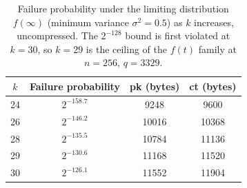 \begin{table}[h]
\centering
\caption{Failure probability under the limiting distribution $f(\infty)$
(minimum variance $\sigma^2=0.5$) as $k$ increases, uncompressed. The
$2^{-128}$ bound is first violated at $k=30$, so $k=29$ is the ceiling of
the $f(t)$ family at $n=256$, $q=3329$.}
\label{tab:theoretical-ceiling}
\begin{tabular}{cccc}
\toprule
$k$ & Failure probability & pk (bytes) & ct (bytes) \\
\midrule
24 & $2^{-158.7}$ & 9248  & 9600  \\
26 & $2^{-146.2}$ & 10016 & 10368 \\
28 & $2^{-135.5}$ & 10784 & 11136 \\
29 & $2^{-130.6}$ & 11168 & 11520 \\
30 & $2^{-126.1}$ & 11552 & 11904 \\
\bottomrule
\end{tabular}
\end{table}
